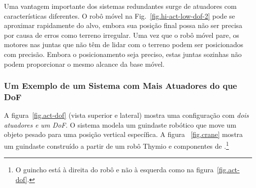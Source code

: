 
Uma vantagem importante dos sistemas redundantes surge de atuadores com características diferentes. O robô móvel na Fig.~\ref{fig.hi-act-low-dof-2} pode se aproximar rapidamente do alvo, embora sua posição final possa não ser precisa por causa de erros como terreno irregular. Uma vez que o robô móvel pare, os motores nas juntas que não têm de lidar com o terreno podem ser posicionados com precisão. Embora o posicionamento seja preciso, estas juntas sozinhas não podem proporcionar o mesmo alcance da base móvel.


\subsubsection*{Um Exemplo de um Sistema com Mais Atuadores do que DoF}

A figura~\ref{fig.act-dof} (vista superior e lateral) mostra uma configuração com \emph{dois atuadores e um DoF}. O sistema modela um guindaste robótico que move um objeto pesado para uma posição vertical específica. A figura ~\ref{fig.crane} mostra um guindaste construído a partir de um robô Thymio e componentes de \lego.\footnote{O guincho está à direita do robô e não à esquerda como na figura~\ref{fig.act-dof}.}

